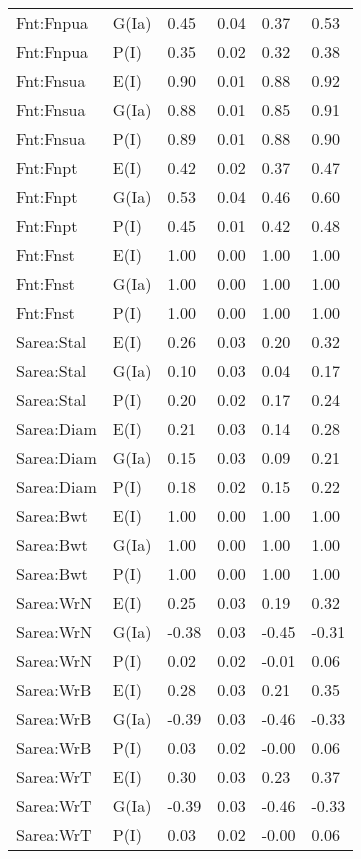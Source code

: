 \begin{center}
\begin{longtable}{|p{1.1in}|p{0.7in}|p{0.7in}|p{0.6in}|p{0.6in}|p{0.6in}|}
  Fnt:Fnpua & G(Ia) & 0.45 & 0.04 & 0.37 & 0.53 \\ 
  Fnt:Fnpua & P(I) & 0.35 & 0.02 & 0.32 & 0.38 \\ 
  Fnt:Fnsua & E(I) & 0.90 & 0.01 & 0.88 & 0.92 \\ 
  Fnt:Fnsua & G(Ia) & 0.88 & 0.01 & 0.85 & 0.91 \\ 
  Fnt:Fnsua & P(I) & 0.89 & 0.01 & 0.88 & 0.90 \\ 
  Fnt:Fnpt & E(I) & 0.42 & 0.02 & 0.37 & 0.47 \\ 
  Fnt:Fnpt & G(Ia) & 0.53 & 0.04 & 0.46 & 0.60 \\ 
  Fnt:Fnpt & P(I) & 0.45 & 0.01 & 0.42 & 0.48 \\ 
  Fnt:Fnst & E(I) & 1.00 & 0.00 & 1.00 & 1.00 \\ 
  Fnt:Fnst & G(Ia) & 1.00 & 0.00 & 1.00 & 1.00 \\ 
  Fnt:Fnst & P(I) & 1.00 & 0.00 & 1.00 & 1.00 \\ 
  Sarea:Stal & E(I) & 0.26 & 0.03 & 0.20 & 0.32 \\ 
  Sarea:Stal & G(Ia) & 0.10 & 0.03 & 0.04 & 0.17 \\ 
  Sarea:Stal & P(I) & 0.20 & 0.02 & 0.17 & 0.24 \\ 
  Sarea:Diam & E(I) & 0.21 & 0.03 & 0.14 & 0.28 \\ 
  Sarea:Diam & G(Ia) & 0.15 & 0.03 & 0.09 & 0.21 \\ 
  Sarea:Diam & P(I) & 0.18 & 0.02 & 0.15 & 0.22 \\ 
  Sarea:Bwt & E(I) & 1.00 & 0.00 & 1.00 & 1.00 \\ 
  Sarea:Bwt & G(Ia) & 1.00 & 0.00 & 1.00 & 1.00 \\ 
  Sarea:Bwt & P(I) & 1.00 & 0.00 & 1.00 & 1.00 \\ 
  Sarea:WrN & E(I) & 0.25 & 0.03 & 0.19 & 0.32 \\ 
  Sarea:WrN & G(Ia) & -0.38 & 0.03 & -0.45 & -0.31 \\ 
  Sarea:WrN & P(I) & 0.02 & 0.02 & -0.01 & 0.06 \\ 
  Sarea:WrB & E(I) & 0.28 & 0.03 & 0.21 & 0.35 \\ 
  Sarea:WrB & G(Ia) & -0.39 & 0.03 & -0.46 & -0.33 \\ 
  Sarea:WrB & P(I) & 0.03 & 0.02 & -0.00 & 0.06 \\ 
  Sarea:WrT & E(I) & 0.30 & 0.03 & 0.23 & 0.37 \\ 
  Sarea:WrT & G(Ia) & -0.39 & 0.03 & -0.46 & -0.33 \\ 
  Sarea:WrT & P(I) & 0.03 & 0.02 & -0.00 & 0.06 \\ 

\end{longtable}
\end{center}

